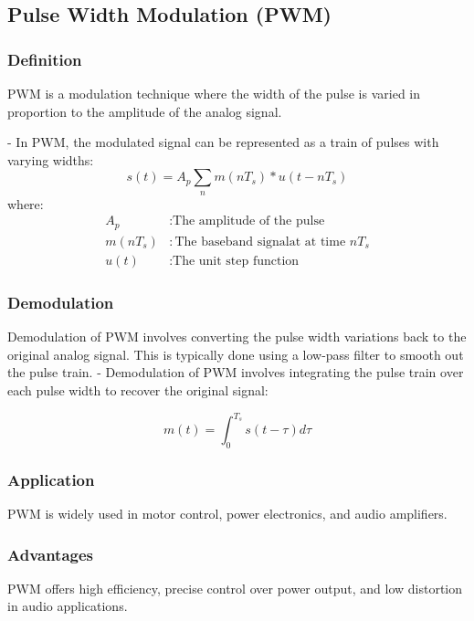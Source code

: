 \documentclass{IEEEtran}
\begin{document}
	
	\subsection{Pulse Width Modulation (PWM)}
	
	\subsubsection{Definition}
	PWM is a modulation technique where the width of the pulse is varied in proportion to the amplitude of the analog signal.
	
	- In PWM, the modulated signal can be represented as a train of pulses with varying widths:
	\begin{equation}
		s(t) = A_p \sum_n m(nT_s) * u(t - nT_s)
	\end{equation}
	where: 
	\begin{align*}
		A_p  & : \text{The amplitude of the pulse} \\
		m(nT_s) & : \text{The baseband signalat at time $nT_s$} \\
		u(t)  & : \text{The unit step function}
	\end{align*}
	
	\subsubsection{Demodulation}
	 Demodulation of PWM involves converting the pulse width variations back to the original analog signal. This is typically done using a low-pass filter to smooth out the pulse train.
	- Demodulation of PWM involves integrating the pulse train over each pulse width to recover the original signal:

	
	\begin{equation}
		m(t) = \int_{0}^{T_s} s(t - \tau) d\tau
	\end{equation}
	
	\subsubsection{Application}
	PWM is widely used in motor control, power electronics, and audio amplifiers.
	
	\subsubsection{Advantages}
	 PWM offers high efficiency, precise control over power output, and low distortion in audio applications.
	
\end{document}
